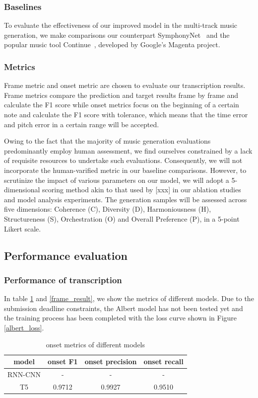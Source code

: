 \documentclass{article}
\begin{document}
\subsubsection{Baselines} To evaluate the effectiveness of our improved model in the multi-track music generation, we make comparisons our counterpart SymphonyNet~\citep{liu2022symphony} and the popular music tool Continue~\citep{magentastudio}, developed by Google's Magenta project.

\subsubsection{Metrics} 
Frame metric and onset metric are chosen to evaluate our transcription results. Frame metrics compare the prediction and target results frame by frame and calculate the F1 score while onset metrics focus on the beginning of a certain note and calculate the F1 score with tolerance, which means that the time error and pitch error in a certain range will be accepted. 

Owing to the fact that the majority of music generation evaluations predominantly employ human assessment, we find ourselves constrained by a lack of requisite resources to undertake such evaluations. Consequently, we will not incorporate the human-varified metric in our baseline comparisons. 
However, to scrutinize the impact of various parameters on our model, we will adopt a 5-dimensional scoring method akin to that used by [xxx] in our ablation studies and model analysis experiments.
The generation samples will be assessed across five dimensions: Coherence (C), Diversity (D), Harmoniousness (H), Structureness (S), Orchestration (O) and Overall Preference (P), in a 5-point Likert scale.

\subsection{Performance evaluation}
\subsubsection{Performance of transcription}
In table \ref{onset_result} and \ref{frame_result}, we show the metrics of different models. Due to the submission deadline constraints, the Albert model has not been tested yet and the training process has been completed with the loss curve shown in Figure \ref{albert_loss}.
\begin{table}[H]
    \centering
    \begin{tabular}{cccc}
        \hline
         model &  onset F1 & onset precision & onset recall\\
         \hline
         RNN-CNN &  - & - & - \\
         T5 & 0.9712 & 0.9927 & 0.9510 \\
         \hline
    \end{tabular}
    \caption{onset metrics of different models}
    \label{onset_result}
\end{table}
\end{document}
